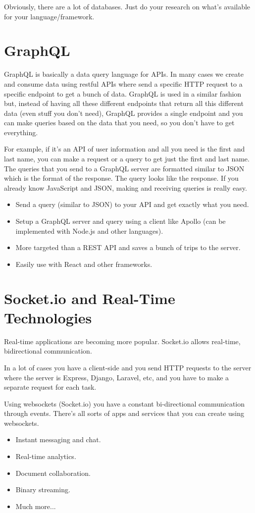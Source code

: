 Obviously, there are a lot of databases. Just do your research on what's available for your language/framework.

\section{GraphQL}
GraphQL is basically a data query language for APIs. In many cases we create and consume data using restful APIs where send a specific HTTP request to a specific endpoint to get a bunch of data. GraphQL is used in a similar fashion but, instead of having all these different endpoints that return all this different data (even stuff you don't need), GraphQL provides a single endpoint and you can make queries based on the data that you need, so you don't have to get everything. 

For example, if it's an API of user information and all you need is the first and last name, you can make a request or a query to get just the first and last name. The queries that you send to a GraphQL server are formatted similar to JSON which is the format of the response. The query looks like the response. If you already know JavaScript and JSON, making and receiving queries is really easy. 

\begin{itemize}
    \item Send a query (similar to JSON) to your API and get exactly what you need. 
    \item Setup a GraphQL server and query using a client like Apollo (can be implemented with Node.js and other languages). 
    \item More targeted than a REST API and saves a bunch of trips to the server.
    \item Easily use with React and other frameworks.
\end{itemize}

\section{Socket.io and Real-Time Technologies}
Real-time applications are becoming more popular. Socket.io allows real-time, bidirectional communication.

In a lot of cases you have a client-side and you send HTTP requests to the server where the server is Express, Django, Laravel, etc, and you have to make a separate request for each task. 

Using websockets (Socket.io) you have a constant bi-directional communication through events. There's all sorts of apps and services that you can create using websockets.
\begin{itemize}
    \item Instant messaging and chat.
    \item Real-time analytics.
    \item Document collaboration.
    \item Binary streaming.
    \item Much more...
\end{itemize}

